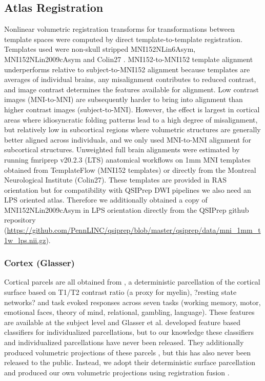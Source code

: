 \documentclass[10pt,letterpaper]{article}
\begin{document}
\subsection{Atlas Registration}
Nonlinear volumetric registration transforms for transformations between template spaces were computed by direct template-to-template registration. Templates used were non-skull stripped MNI152NLin6Asym, MNI152NLin2009cAsym and Colin27 . MNI152-to-MNI152 template alignment underperforms relative to subject-to-MNI152 alignment because templates are averages of individual brains, any misalignment contributes to reduced contrast, and image contrast determines the features available for alignment. Low contrast images (MNI-to-MNI) are subsequently harder to bring into alignment than higher contrast images (subject-to-MNI). However, the effect is largest in cortical areas where idiosyncratic folding patterns lead to a high degree of misalignment, but relatively low in subcortical regions where volumetric structures are generally better aligned across individuals, and we only used MNI-to-MNI alignment for subcortical structures. Unweighted full brain alignments were estimated by running fmriprep v20.2.3 (LTS) anatomical workflows on 1mm MNI templates obtained from TemplateFlow (MNI152 templates) or directly from the Montreal Neurological Institute (Colin27). These templates are provided in RAS orientation but for compatibility with QSIPrep DWI pipelines we also need an LPS oriented atlas. Therefore we additionally obtained a copy of MNI152NLin2009cAsym in LPS orientation directly from the QSIPrep github repository (\url{https://github.com/PennLINC/qsiprep/blob/master/qsiprep/data/mni_1mm_t1w_lps.nii.gz}).
\\
\subsubsection{Cortex (Glasser)} Cortical parcels are all obtained from , a deterministic parcellation of the cortical surface based on T1/T2 contrast ratio (a proxy for myelin), ?resting state networks? and task evoked responses across seven tasks (working memory, motor, emotional faces, theory of mind, relational, gambling, language). These features are available at the subject level and Glasser et al. developed feature based classifiers for individualized parcellations, but to our knowledge these classifiers and individualized parcellations have never been released. They additionally produced volumetric projections of these parcels , but this has also never been released to the public. Instead, we adopt their deterministic surface parcellation and produced our own volumetric projections using registration fusion . 
\end{document}
